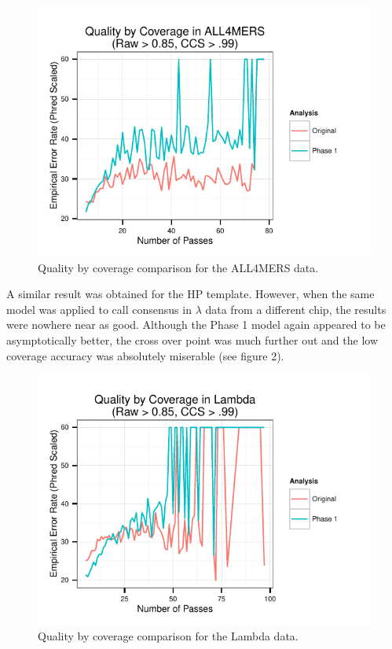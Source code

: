 \documentclass[DIV=calc, paper=a4, fontsize=11pt, twocolumn]{scrartcl}	 %
\begin{document}
\begin{figure}[h]
\includegraphics[width=\linewidth]{ALL4MERsErrorsWithCoverage}
\caption{Quality by coverage comparison for the ALL4MERS data.}
\end{figure}

A similar result was obtained for the HP template.  However, when the same model was applied to call consensus in $\lambda$ data from a different chip, the results were nowhere near as good.  Although the Phase 1 model again appeared to be asymptotically better, the cross over point was much further out and the low coverage accuracy was absolutely miserable (see figure 2).  

\begin{figure}[ht]
\includegraphics[width=\linewidth]{LambdaerrorsWithCoverage}
\caption{Quality by coverage comparison for the Lambda data.}
\end{figure}
\end{document}
